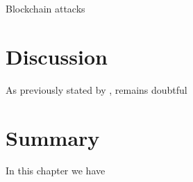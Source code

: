 Blockchain attacks

\section{Discussion}

As previously stated by , remains doubtful 


\section{Summary}

In this chapter we have





